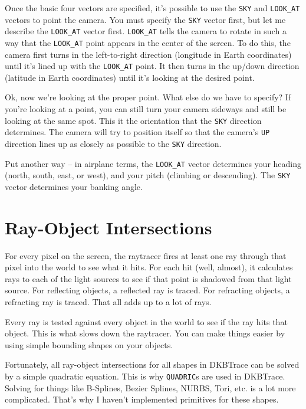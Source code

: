 Once the basic four vectors are specified, it's possible to use the
{\tt SKY} and {\tt LOOK_AT} vectors
to point the camera.  You must
specify the {\tt SKY} vector first, but let me describe the
{\tt LOOK_AT} vector first.  {\tt LOOK_AT} tells the camera to rotate in
such a way that the {\tt LOOK_AT} point appears in the center of the
screen.  To do this, the camera first turns in the left-to-right
direction (longitude in Earth coordinates) until it's lined up with
the {\tt LOOK_AT} point.  It then turns in the up/down direction (latitude
in Earth coordinates) until it's looking at the desired point.

Ok, now we're looking at the proper point.  What else do we have to
specify?  If you're looking at a point, you can still turn your camera
sideways and still be looking at the same spot.  This it the
orientation that the {\tt SKY} direction determines.  The camera will
try to position itself so that the camera's {\tt UP} direction lines
up as closely as possible to the {\tt SKY} direction.

Put another way -- in airplane terms, the {\tt LOOK_AT} vector
determines your heading (north, south, east, or west), and your pitch
(climbing or descending).  The {\tt SKY} vector determines your
banking angle.

\section{Ray-Object Intersections}

For every pixel on the screen, the raytracer fires at least one ray through
that pixel into the world to see what it hits.  For each hit (well, almost),
it calculates rays to each of the light sources to see if that point is
shadowed from that light source.  For reflecting objects, a reflected ray is
traced.  For refracting objects, a refracting ray is traced.  That all adds up
to a lot of rays.

Every ray is tested against every object in the world to see if the ray hits
that object. This is what slows down the raytracer.  You can make things
easier by using simple bounding shapes on your
objects.

Fortunately, all ray-object intersections for all shapes in DKBTrace can be
solved by a simple quadratic equation.  This is why {\tt QUADRIC}s are used in
DKBTrace.  Solving for things like B-Splines, Bezier Splines, NURBS, Tori,
etc. is a lot more complicated.  That's why I haven't implemented primitives
for these shapes.

